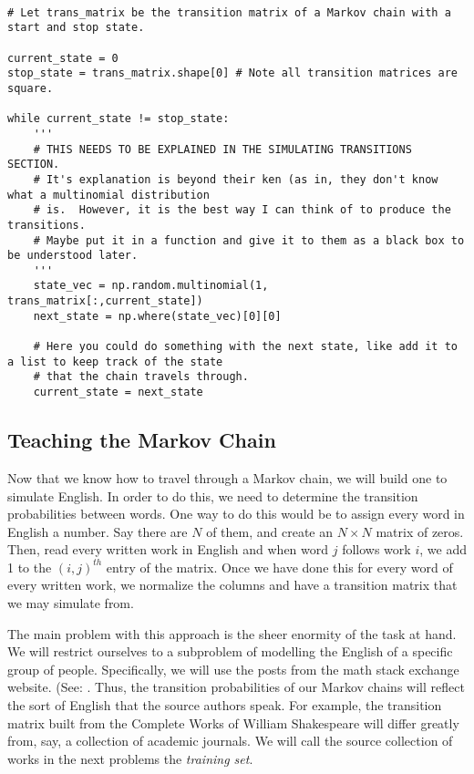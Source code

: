 \begin{lstlisting}

# Let trans_matrix be the transition matrix of a Markov chain with a start and stop state.

current_state = 0
stop_state = trans_matrix.shape[0] # Note all transition matrices are square.

while current_state != stop_state:
	'''
	# THIS NEEDS TO BE EXPLAINED IN THE SIMULATING TRANSITIONS SECTION.
	# It's explanation is beyond their ken (as in, they don't know what a multinomial distribution
	# is.  However, it is the best way I can think of to produce the transitions.
	# Maybe put it in a function and give it to them as a black box to be understood later.
	'''
	state_vec = np.random.multinomial(1, trans_matrix[:,current_state])
	next_state = np.where(state_vec)[0][0]
	
	# Here you could do something with the next state, like add it to a list to keep track of the state
	# that the chain travels through.
	current_state = next_state
\end{lstlisting}

\begin{problem}

\end{problem}

\subsection*{Teaching the Markov Chain}

Now that we know how to travel through a Markov chain, we will build one to simulate English.
In order to do this, we need to determine the transition probabilities between words.
One way to do this would be to assign every word in English a number.  Say there are $N$ of them, and create an $N\times N$ matrix of zeros.
Then, read every written work in English and when word $j$ follows work $i$, we add 1 to the $(i,j)^{th}$ entry of the matrix.
Once we have done this for every word of every written work, we normalize the columns and have a transition matrix that we may simulate from.

The main problem with this approach is the sheer enormity of the task at hand.
We will restrict ourselves to a subproblem of modelling the English of a specific group of people.
Specifically, we will use the posts from the math stack exchange website.
(See: .
Thus, the transition probabilities of our Markov chains will reflect the sort of English that the source authors speak.
For example, the transition matrix built from the Complete Works of William Shakespeare will differ greatly from, say, a collection of academic journals.
We will call the source collection of works in the next problems the \emph{training set}.

